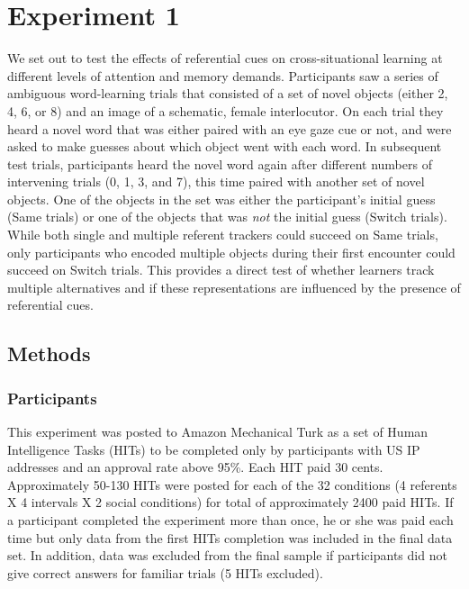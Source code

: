 \documentclass[10pt,letterpaper]{article}
\begin{document}
\section{Experiment 1}

We set out to test the effects of referential cues on cross-situational learning at different levels of attention and memory demands. Participants saw a series of ambiguous word-learning trials that consisted of a set of novel objects (either 2, 4, 6, or 8) and an image of a schematic, female interlocutor. On each trial they heard a novel word that was either paired with an eye gaze cue or not, and were asked to make guesses about which object went with each word. In subsequent test trials, participants heard the novel word again after different numbers of intervening trials (0, 1, 3, and 7), this time paired with another set of novel objects. One of the objects in the set was either the participant's initial guess (Same trials) or one of the objects that was \emph{not} the initial guess (Switch trials). While both single and multiple referent trackers could succeed on Same trials, only participants who encoded multiple objects during their first encounter could succeed on Switch trials. This provides a direct test of whether learners track multiple alternatives and if these representations are influenced by the presence of referential cues. 

\subsection{Methods}

\subsubsection{Participants}

This experiment was posted to Amazon Mechanical Turk as a set of
Human Intelligence Tasks (HITs) to be completed only by participants with US IP
addresses and an approval rate above 95\%. Each HIT paid 30 cents. Approximately 50-130 HITs were posted for each of the 32 conditions (4 referents X 4 intervals X 2 social conditions) for total of approximately 2400 paid HITs. If a participant completed the experiment more than once, he or she was paid each time but only data from the first HITs completion was included in the final data set. In
addition, data was excluded from the final sample if participants did not give correct answers for familiar trials (5 HITs excluded).
\end{document}
